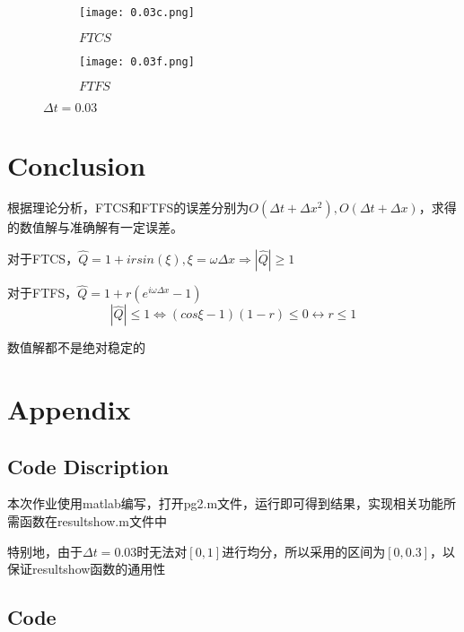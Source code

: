 \documentclass{article}
\begin{document}
\begin{figure}[H]
  \centering
  \begin{subfigure}[b]{0.47\textwidth}
    \centering
    \texttt{[image: 0.03c.png]}
    \caption{$FTCS$}

  \end{subfigure}
  \begin{subfigure}[b]{0.47\textwidth}
    \centering
    \texttt{[image: 0.03f.png]}
    \caption{$FTFS$}

  \end{subfigure}
  \caption{$\Delta t=0.03$}
\end{figure}
\section{Conclusion}
根据理论分析，FTCS和FTFS的误差分别为$O(\Delta t+\Delta x^2),O(\Delta t+\Delta x)$，求得的数值解与准确解有一定误差。

对于FTCS，$\hat{Q}=1+irsin(\xi),\xi=\omega \Delta x\Rightarrow |\hat{Q}|\geq 1$

对于FTFS，$\hat{Q}=1+r(e^{i\omega \Delta x}-1)$
$$|\hat{Q}|\leq 1\Leftrightarrow (cos\xi-1)(1-r)\leq 0\leftrightarrow r\leq 1$$

数值解都不是绝对稳定的

\section{Appendix}
\subsection{Code Discription}

本次作业使用matlab编写，打开pg2.m文件，运行即可得到结果，实现相关功能所需函数在resultshow.m文件中

特别地，由于$\Delta t=0.03$时无法对$[0,1]$进行均分，所以采用的区间为$[0,0.3]$，以保证resultshow函数的通用性

\subsection{Code}


\end{document}
